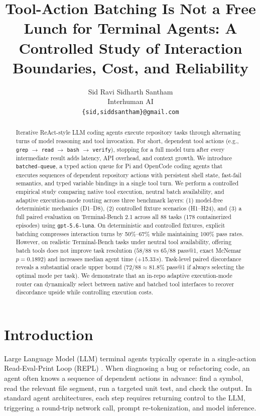 \documentclass{article}
\title{Tool-Action Batching Is Not a Free Lunch for Terminal Agents: A Controlled Study of Interaction Boundaries, Cost, and Reliability}
\author{%
  Sid Ravi \quad Sidharth Santham \\
  Interhuman AI \\
  \texttt{\{sid,siddsantham\}@gmail.com} \\
}
\begin{document}
\maketitle

\begin{abstract}
Iterative ReAct-style LLM coding agents execute repository tasks through alternating turns of model reasoning and tool invocation. For short, dependent tool actions (e.g., \texttt{grep} $\rightarrow$ \texttt{read} $\rightarrow$ \texttt{bash} $\rightarrow$ \texttt{verify}), stopping for a full model turn after every intermediate result adds latency, API overhead, and context growth. We introduce \texttt{batched-queue}, a typed action queue for Pi and OpenCode coding agents that executes sequences of dependent repository actions with persistent shell state, fast-fail semantics, and typed variable bindings in a single tool turn. We perform a controlled empirical study comparing native tool execution, neutral batch availability, and adaptive execution-mode routing across three benchmark layers: (1) model-free deterministic mechanics (D1--D8), (2) controlled fixture scenarios (H1--H24), and (3) a full paired evaluation on Terminal-Bench 2.1 across all 88 tasks (178 containerized episodes) using \texttt{gpt-5.6-luna}. On deterministic and controlled fixtures, explicit batching compresses interaction turns by 50\%--67\% while maintaining 100\% pass rates. However, on realistic Terminal-Bench tasks under neutral tool availability, offering batch tools does not improve task resolution ($58/88$ vs $65/88$ pass@1, exact McNemar $p = 0.1892$) and increases median agent time (+15.33\,s). Task-level paired discordance reveals a substantial oracle upper bound ($72/88 \approx 81.8\%$ pass@1 if always selecting the optimal mode per task). We demonstrate that an in-repo adaptive execution-mode router can dynamically select between native and batched tool interfaces to recover discordance upside while controlling execution costs.
\end{abstract}

\section{Introduction}

Large Language Model (LLM) terminal agents typically operate in a single-action Read-Eval-Print Loop (REPL) \citep{react2022}. When diagnosing a bug or refactoring code, an agent often knows a sequence of dependent actions in advance: find a symbol, read the relevant file segment, run a targeted unit test, and check the output. In standard agent architectures, each step requires returning control to the LLM, triggering a round-trip network call, prompt re-tokenization, and model inference.
\end{document}
